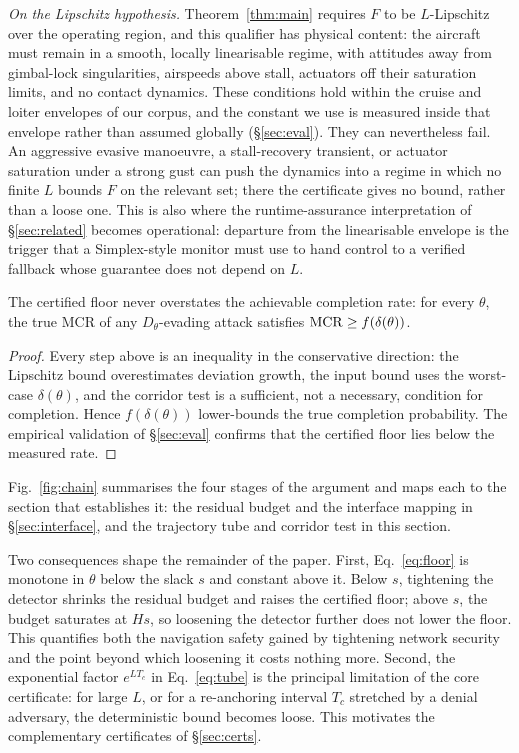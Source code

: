\emph{On the Lipschitz hypothesis.} Theorem~\ref{thm:main} requires $F$ to be
$L$-Lipschitz over the operating region, and this qualifier has physical
content: the aircraft must remain in a smooth, locally linearisable regime, with
attitudes away from gimbal-lock singularities, airspeeds above stall, actuators
off their saturation limits, and no contact dynamics. These conditions hold
within the cruise and loiter envelopes of our corpus, and the constant
we use is measured inside that envelope rather than assumed globally
(\S\ref{sec:eval}). They can nevertheless fail. An aggressive evasive manoeuvre,
a stall-recovery transient, or actuator saturation under a strong gust can push
the dynamics into a regime in which no finite $L$ bounds $F$ on the relevant
set; there the certificate gives no bound, rather than a loose one. This
is also where the runtime-assurance interpretation of
\S\ref{sec:related} becomes operational: departure from the linearisable
envelope is the trigger that a Simplex-style monitor must use to hand control to
a verified fallback whose guarantee does not depend on $L$.

\begin{proposition}[Soundness]
\label{prop:sound}
The certified floor never overstates the achievable completion rate: for every
$\theta$, the true MCR of any $D_\theta$-evading attack satisfies
$\mathrm{MCR}\ge f(\delta(\theta))$.
\end{proposition}
\begin{proof}
Every step above is an inequality in the conservative direction: the Lipschitz
bound overestimates deviation growth, the input bound uses the worst-case
$\delta(\theta)$, and the corridor test is a sufficient, not a necessary, condition for
completion. Hence $f(\delta(\theta))$ lower-bounds the
true completion probability. The empirical validation of \S\ref{sec:eval}
confirms that the certified floor lies below the measured rate.
\end{proof}

Fig.~\ref{fig:chain} summarises the four stages of the argument and maps each
to the section that establishes it: the residual budget and the interface
mapping in \S\ref{sec:interface}, and the trajectory tube and corridor test in
this section.

Two consequences shape the remainder of the paper. First, Eq.~\eqref{eq:floor}
is monotone in $\theta$ below the slack $s$ and constant above it. Below $s$,
tightening the detector shrinks the residual budget and raises the certified
floor; above $s$, the budget saturates at $Hs$, so loosening the detector further
does not lower the floor. This quantifies both the navigation safety gained by
tightening network security and the point beyond which loosening it costs
nothing more. Second,
the exponential factor $e^{LT_c}$ in Eq.~\eqref{eq:tube} is the principal
limitation of the core certificate: for large $L$, or for a re-anchoring
interval $T_c$ stretched by a denial adversary, the deterministic bound becomes
loose. This motivates the complementary certificates of \S\ref{sec:certs}.

